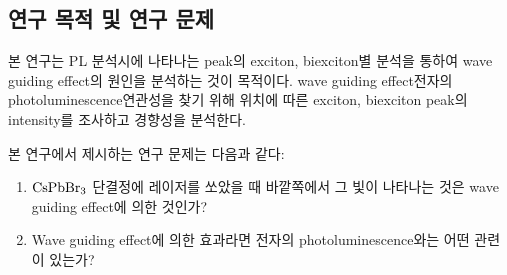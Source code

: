 \subsection{연구 목적 및 연구 문제}
본 연구는 PL 분석시에 나타나는 peak의 exciton, biexciton별 분석을 통하여 wave guiding effect의 원인을 분석하는 것이 목적이다. wave guiding effect\와 전자의 photoluminescence 연관성을 찾기 위해 위치에 따른 exciton, biexciton peak의 intensity를 조사하고 경향성을 분석한다.

본 연구에서 제시하는 연구 문제는 다음과 같다:
\begin{enumerate}
	\item $\rm CsPbBr_3$ 단결정에 레이저를 쏘았을 때 바깥쪽에서 그 빛이 나타나는 것은 wave guiding effect에 의한 것인가?
	\item Wave guiding effect에 의한 효과라면 전자의 photoluminescence와는 어떤 관련이 있는가? 
\end{enumerate}

